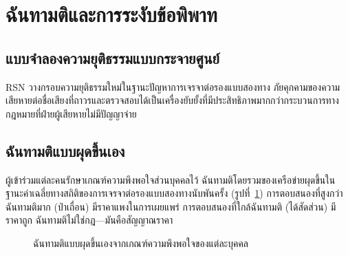 \documentclass[11pt,a4paper,twocolumn]{article}
\begin{document}
\section{ฉันทามติและการระงับข้อพิพาท}

\subsection{แบบจำลองความยุติธรรมแบบกระจายศูนย์}

RSN วางกรอบความยุติธรรมใหม่ในฐานะปัญหาการเจรจาต่อรองแบบสองทาง ภัยคุกคามของความเสียหายต่อชื่อเสียงที่ถาวรและตรวจสอบได้เป็นเครื่องยับยั้งที่มีประสิทธิภาพมากกว่ากระบวนการทางกฎหมายที่ฝ่ายผู้เสียหายไม่มีปัญญาจ่าย

\subsection{ฉันทามติแบบผุดขึ้นเอง}

ผู้เข้าร่วมแต่ละคนรักษาเกณฑ์ความพึงพอใจส่วนบุคคลไว้ ฉันทามติโดยรวมของเครือข่ายผุดขึ้นในฐานะค่าเฉลี่ยทางสถิติของการเจรจาต่อรองแบบสองทางนับพันครั้ง (รูปที่~\ref{fig:consensus}) การตอบสนองที่สูงกว่าฉันทามติมาก (ป่าเถื่อน) มีราคาแพงในการเผยแพร่ การตอบสนองที่ใกล้ฉันทามติ (ได้สัดส่วน) มีราคาถูก ฉันทามติไม่ใช่กฎ---มันคือสัญญาณราคา

\begin{figure}[ht]
\centering
{}
\caption{ฉันทามติแบบผุดขึ้นเองจากเกณฑ์ความพึงพอใจของแต่ละบุคคล}
\label{fig:consensus}
\end{figure}
\end{document}
